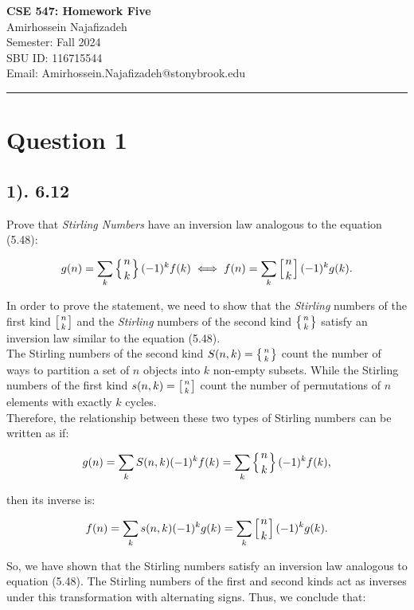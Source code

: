 \documentclass[12pt]{article}
\begin{document}
\begin{center}
    {\LARGE\textbf{CSE 547: Homework Five}} \\[1em]
    {\large Amirhossein Najafizadeh} \\[1em]
    Semester: Fall 2024 \\ 
    SBU ID: 116715544 \\
    Email: Amirhossein.Najafizadeh@stonybrook.edu \\[1em]
    \noindent\rule{\textwidth}{0.6pt}
\end{center}

\section*{Question 1}
\subsection*{1). 6.12}

Prove that \textit{Stirling Numbers} have an inversion law analogous to the equation (5.48):

\[
g(n) = \sum_k \left\{ {n \atop k} \right\} (-1)^k f(k) \iff f(n) = \sum_k \left[ {n \atop k} \right] (-1)^k g(k).
\]

In order to prove the statement, we need to show that the \textit{Stirling} numbers of the first kind \( \left[ {n \atop k} \right] \) and the \textit{Stirling} numbers of the second kind \( \left\{ {n \atop k} \right\} \) satisfy an inversion law similar to the equation (5.48).\\

The Stirling numbers of the second kind \( S(n, k) = \left\{ {n \atop k} \right\} \) count the number of ways to partition a set of \( n \) objects into \( k \) non-empty subsets. While the Stirling numbers of the first kind \( s(n, k) = \left[ {n \atop k} \right] \) count the number of permutations of \( n \) elements with exactly \( k \) cycles.\\

Therefore, the relationship between these two types of Stirling numbers can be written as if:

\[ g(n) = \sum_k S(n, k)(-1)^k f(k) =  \sum_k  \left\{ {n \atop k}  \right\} (-1)^k f(k),  \]

then its inverse is:

\[ f(n) =  \sum_k s(n, k)(-1)^k g(k) =  \sum_k  \left[ {n  \atop k }  \right] (-1)^k g(k).  \]

So, we have shown that the Stirling numbers satisfy an inversion law analogous to equation (5.48). The Stirling numbers of the first and second kinds act as inverses under this transformation with alternating signs. Thus, we conclude that:
\end{document}
